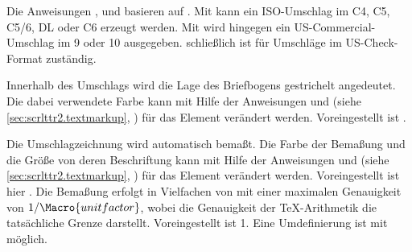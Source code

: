 Die Anweisungen ,  und
 basieren auf . Mit
 kann ein ISO-Umschlag im  C4, C5, C5/6,
DL oder C6 erzeugt werden. Mit
 wird hingegen ein US-Commercial-Umschlag im
 9 oder 10 ausgegeben.  schließlich ist für
Umschläge im US-Check-Format zuständig.

%
Innerhalb des Umschlags wird die Lage des Briefbogens gestrichelt
angedeutet. Die dabei verwendete Farbe kann mit Hilfe der Anweisungen
 und 
(siehe \autoref{sec:scrlttr2.textmarkup},
) für das Element
 verändert
werden. Voreingestellt ist .%

%
Die Umschlagzeichnung wird automatisch bemaßt. Die Farbe der Bemaßung und die
Größe von deren Beschriftung kann mit Hilfe der Anweisungen
 und 
(siehe \autoref{sec:scrlttr2.textmarkup},
) für das Element
 verändert
werden. Voreingestellt ist hier . Die Bemaßung erfolgt in
Vielfachen von  mit einer maximalen Genauigkeit von
$1/\Macro{unitfactor}$, wobei die Genauigkeit der \TeX-Arithmetik die
tatsächliche Grenze darstellt. Voreingestellt ist 1. Eine Umdefinierung ist
mit  möglich.%

